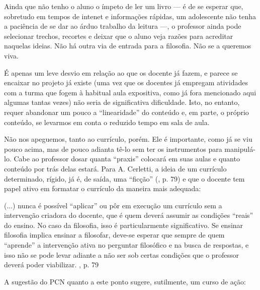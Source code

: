 \documentclass[12pt,a4paper]{article}
\newenvironment{citac}{\begin{addmargin}[4cm]{1em} \footnotesize}{\normalfont \end{addmargin}}
\begin{document}
	Ainda que não tenho o aluno o ímpeto de ler um livro --- é de se 
	esperar que, sobretudo em tempos de intenet e informações rápidas, 
	um adolescente não tenha a paciência de se dar ao árduo trabalho da 
	leitura ---, o professor ainda pode selecionar trechos, recortes 
	e deixar que o aluno veja razões para acreditar naquelas ideias. 
	Não há outra via de entrada para a filosofia. Não se a queremos viva. 
	
	É apenas um leve desvio em relação ao que os docente já fazem, e parece 
	se encaixar no projeto já existe (uma vez que os docentes já empregam  
	atividades com a turma que fogem à habitual aula expositiva, como já 
	fora mencionado aqui algumas tantas vezes) não seria de significativa 
	dificuldade. Isto, no entanto, requer abandonar um pouco a ``linearidade'' 
	do conteúdo e, em parte, o próprio conteúdo, se levarmos em conta o 
	reduzido tempo em sala de aula. 
	
	Não nos apeguemos, tanto ao currículo, porém. Ele é importante, como 
	já se viu pouco acima, mas de pouco adianta tê-lo sem ter os 
	instrumentos para manipulá-lo. Cabe ao professor dosar quanta ``praxis'' 
	colocará em suas aulas e quanto conteúdo por trás delas estará. 	
	Para A. Cerletti, a ideia de um currículo determinado, rígido, já é, 
	de saída, uma ``ficção'' (\cite{cerletti}, p. 79) e que o docente tem 
	papel ativo em formatar o currículo da maneira mais adequada: 
	
	\begin{citac}
		(...) nunca é possível ``aplicar'' ou pôr em execução um currículo 
		sem a intervenção criadora do docente, que é quem deverá assumir as 
		condições ``reais'' do ensino. No caso da filosofia, isso é 
		particularmente significativo. Se ensinar filosofia implica ensinar 
		a filosofar, deve-se esperar que sempre de quem ``aprende'' a 
		intervenção ativa no perguntar filosófico e na busca de respostas, e 
		isso não se pode levar adiante a não ser sob certas condições que o 
		professor deverá poder viabilizar. \cite{cerletti}, p. 79
	\end{citac}
	
	A sugestão do PCN quanto a este ponto sugere, sutilmente, um curso de 
	ação: 
	
\end{document}
